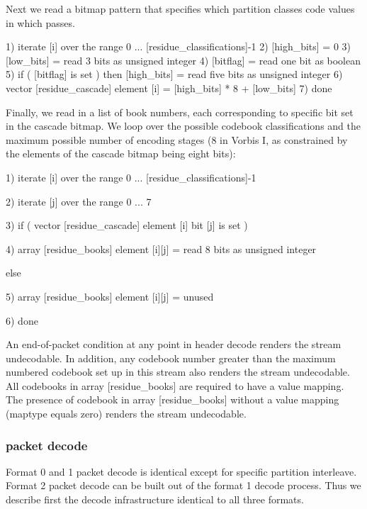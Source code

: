Next we read a bitmap pattern that specifies which partition classes
code values in which passes.

\begin{programlisting}
  1) iterate [i] over the range 0 ... [residue\_classifications]-1 {
       2) [high\_bits] = 0
       3) [low\_bits] = read 3 bits as unsigned integer
       4) [bitflag] = read one bit as boolean
       5) if ( [bitflag] is set ) then [high\_bits] = read five bits as unsigned integer
       6) vector [residue\_cascade] element [i] = [high\_bits] * 8 + [low\_bits]
     }
  7) done
\end{programlisting}

Finally, we read in a list of book numbers, each corresponding to
specific bit set in the cascade bitmap.  We loop over the possible
codebook classifications and the maximum possible number of encoding
stages (8 in Vorbis I, as constrained by the elements of the cascade
bitmap being eight bits):

\begin{programlisting}
  1) iterate [i] over the range 0 ... [residue\_classifications]-1 {
       2) iterate [j] over the range 0 ... 7 {
            3) if ( vector [residue\_cascade] element [i] bit [j] is set ) {
                 4) array [residue\_books] element [i][j] = read 8 bits as unsigned integer

               } else {
                 5) array [residue\_books] element [i][j] = unused

               }
          }
      }

  6) done
\end{programlisting}

An end-of-packet condition at any point in header decode renders the
stream undecodable.  In addition, any codebook number greater than the
maximum numbered codebook set up in this stream also renders the
stream undecodable. All codebooks in array [residue\_books] are
required to have a value mapping.  The presence of codebook in array
[residue\_books] without a value mapping (maptype equals zero) renders
the stream undecodable.



\subsubsection{packet decode}

Format 0 and 1 packet decode is identical except for specific
partition interleave.  Format 2 packet decode can be built out of the
format 1 decode process.  Thus we describe first the decode
infrastructure identical to all three formats.

